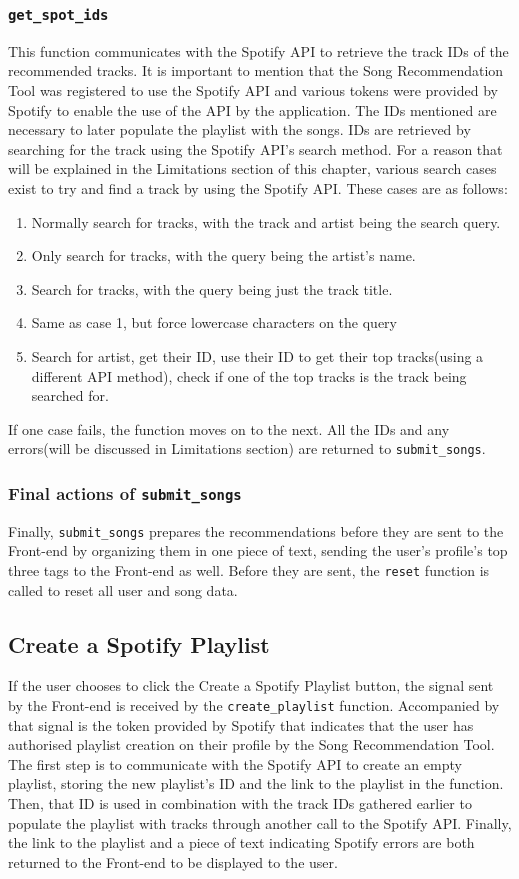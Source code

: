 \documentclass{l4proj}
\begin{document}
\subsubsection{\texttt{get\_spot\_ids}}
This function communicates with the Spotify API to retrieve the track IDs of the recommended tracks. It is important to mention that the Song Recommendation Tool was registered to use the Spotify API and various tokens were provided by Spotify to enable the use of the API by the application. The IDs mentioned are necessary to later populate the playlist with the songs. IDs are retrieved by searching for the track using the Spotify API's search method. For a reason that will be explained in the Limitations section of this chapter, various search cases exist to try and find a track by using the Spotify API. These cases are as follows:
\begin{enumerate}
    \item Normally search for tracks, with the track and artist being the search query.
    \item Only search for tracks, with the query being the artist's name.
    \item Search for tracks, with the query being just the track title.
    \item Same as case 1, but force lowercase characters on the query
    \item Search for artist, get their ID, use their ID to get their top tracks(using a different API method), check if one of the top tracks is the track being searched for.
\end{enumerate}
If one case fails, the function moves on to the next. All the IDs and any errors(will be discussed in Limitations section) are returned to \texttt{submit\_songs}.
\subsubsection{Final actions of \texttt{submit\_songs}}
Finally, \texttt{submit\_songs} prepares the recommendations before they are sent to the Front-end by organizing them in one piece of text, sending the user's profile's top three tags to the Front-end as well. Before they are sent, the \texttt{reset} function is called to reset all user and song data.

\subsection{Create a Spotify Playlist}
If the user chooses to click the Create a Spotify Playlist button, the signal sent by the Front-end is received by the \texttt{create\_playlist} function. Accompanied by that signal is the token provided by Spotify that indicates that the user has authorised playlist creation on their profile by the Song Recommendation Tool. The first step is to communicate with the Spotify API to create an empty playlist, storing the new playlist's ID and the link to the playlist in the function. Then, that ID is used in combination with the track IDs gathered earlier to populate the playlist with tracks through another call to the Spotify API. Finally, the link to the playlist and a piece of text indicating Spotify errors are both returned to the Front-end to be displayed to the user.
\end{document}

